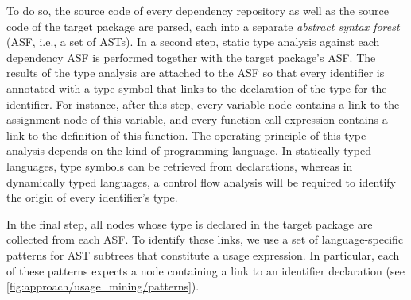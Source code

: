 \documentclass[a4paper,twoside]{article}
\begin{document}
%
To do so, the source code of every dependency repository as well as the source code of the target package are parsed, each into a separate \emph{abstract syntax forest} (ASF, i.e., a set of ASTs).
In a second step, static type analysis against each dependency ASF is performed together with the target package's ASF.
The results of the type analysis are attached to the ASF so that every identifier is annotated with a type symbol that links to the declaration of the type for the identifier.
For instance, after this step, every variable node contains a link to the assignment node of this variable, and every function call expression contains a link to the definition of this function.
The operating principle of this type analysis depends on the kind of programming language.
In statically typed languages, type symbols can be retrieved from declarations, whereas in dynamically typed languages, a control flow analysis will be required to identify the origin of every identifier's type.

In the final step, all nodes whose type is declared in the target package are collected from each ASF.
To identify these links, we use a set of language-specific patterns for AST subtrees that constitute a usage expression.
In particular, each of these patterns expects a node containing a link to an identifier declaration (see \cref{fig:approach/usage_mining/patterns}).
\end{document}
